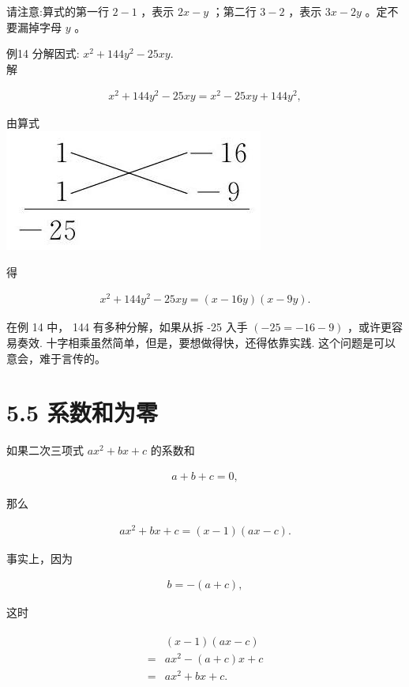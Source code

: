 \documentclass[10pt]{article}
\begin{document}
请注意:算式的第一行 $2-1$ ，表示 $2 x-y$ ；第二行 $3-2$ ，表示 $3 x-2 y$ 。定不要漏掉字母 $y$ 。

例14 分解因式: $x^{2}+144 y^{2}-25 x y$.\\
解

\begin{align*}
x^{2}+144 y^{2}-25 x y=x^{2}-25 x y+144 y^{2},
\end{align*}

由算式\\
\includegraphics[max width=\textwidth, center]{2024_10_30_bd799899fef40368a068g-039}

得

\begin{align*}
x^{2}+144 y^{2}-25 x y=(x-16 y)(x-9 y) .
\end{align*}

在例 14 中， 144 有多种分解，如果从拆 -25 入手 $(-25=-16-9)$ ，或许更容易奏效. 十字相乘虽然简单，但是，要想做得快，还得依靠实践. 这个问题是可以意会，难于言传的。

\section*{5.5 系数和为零}
如果二次三项式 $a x^{2}+b x+c$ 的系数和

\begin{align*}
a+b+c=0,
\end{align*}

那么

\begin{align*}
a x^{2}+b x+c=(x-1)(a x-c) .
\end{align*}

事实上，因为

\begin{align*}
b=-(a+c),
\end{align*}

这时

\begin{align*}
\begin{aligned}
& (x-1)(a x-c) \\
= & a x^{2}-(a+c) x+c \\
= & a x^{2}+b x+c .
\end{aligned}
\end{align*}
\end{document}
